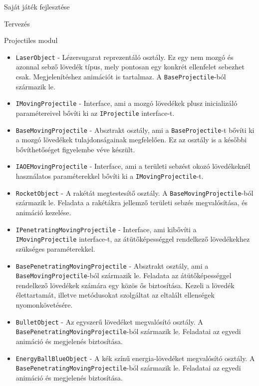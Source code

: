 \begin{MyChapter}{Saját játék fejlesztése}
\begin{MySection}{Tervezés}
\begin{MySubSection}{Projectiles modul}
\begin{itemize}
				\item \texttt{LaserObject} - Lézersugarat reprezentáló osztály. Ez egy nem mozgó és azonnal sebző lövedék típus, mely pontosan egy konkrét ellenfelet sebezhet csak. Megjelenítéshez animációt is tartalmaz. A \texttt{BaseProjectile}-ból származik le.

				\item \texttt{IMovingProjectile} - Interface, ami a mozgó lövedékek plusz inicializáló paramétereivel bővíti ki az \texttt{IProjectile} interface-t.

				\item \texttt{BaseMovingProjectile} - Absztrakt osztály, ami a \texttt{BaseProjectile}-t bővíti ki a mozgó lövedékek tulajdonságainak megfelelően. Ez az osztály is a későbbi bővíthetőséget figyelembe véve készült.

				\item \texttt{IAOEMovingProjectile} - Interface, ami a területi sebzést okozó lövedékeknél használatos paraméterekkel bővíti ki a \texttt{IMovingProjectile}-t.

				\item \texttt{RocketObject} - A rakétát megtestesítő osztály. A \texttt{BaseMovingProjectile}-ból származik le. Feladata a rakétákra jellemző területi sebzés megvalósítása, és animáció kezelése.

				\item \texttt{IPenetratingMovingProjectile} - Interface, ami kibővíti a \texttt{IMovingProjectile} interface-t, az átütőképességgel rendelkező lövedékekhez szükséges paraméterekkel.

				\item \texttt{BasePenetratingMovingProjectile} - Absztrakt osztály, ami a \texttt{Base\-Moving\-Projectile}-ból származik le. Feladata az átütőképességgel rendelkező lövedékek számára egy közös ős biztosítása. Kezeli a lövedék élettartamát, illetve metódusokat szolgáltat az eltalált ellenségek nyomonkövetésére.

				\item \texttt{BulletObject} - Az egyszerű lövedéket megvalósító osztály. A \texttt{Base\-Penetrating\-Moving\-Projectile}-ból származik le. Feladatai az egyedi animáció és megjelenés biztosítása.

				\item \texttt{EnergyBallBlueObject} - A kék színű energia-lövedéket megvalósító osztály. A \texttt{Base\-Penetrating\-Moving\-Projectile}-ból származik le. Feladatai az egyedi animáció és megjelenés biztosítása.


\end{itemize}
\end{MySubSection}
\end{MySection}
\end{MyChapter}
